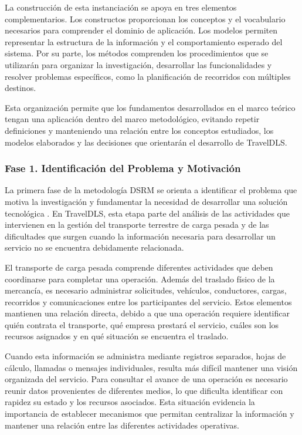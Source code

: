 La construcción de esta instanciación se apoya en tres elementos complementarios. Los constructos proporcionan los conceptos y el vocabulario necesarios para comprender el dominio de aplicación. Los modelos permiten representar la estructura de la información y el comportamiento esperado del sistema. Por su parte, los métodos comprenden los procedimientos que se utilizarán para organizar la investigación, desarrollar las funcionalidades y resolver problemas específicos, como la planificación de recorridos con múltiples destinos.

Esta organización permite que los fundamentos desarrollados en el marco teórico tengan una aplicación dentro del marco metodológico, evitando repetir definiciones y manteniendo una relación entre los conceptos estudiados, los modelos elaborados y las decisiones que orientarán el desarrollo de TravelDLS.

\subsubsection{Fase 1. Identificación del Problema y Motivación}
\label{sec:metodo-fase1}

La primera fase de la metodología DSRM se orienta a identificar el problema que motiva la investigación y fundamentar la necesidad de desarrollar una solución tecnológica \parencite{peffers2007dsrm}. En TravelDLS, esta etapa parte del análisis de las actividades que intervienen en la gestión del transporte terrestre de carga pesada y de las dificultades que surgen cuando la información necesaria para desarrollar un servicio no se encuentra debidamente relacionada.

El transporte de carga pesada comprende diferentes actividades que deben coordinarse para completar una operación. Además del traslado físico de la mercancía, es necesario administrar solicitudes, vehículos, conductores, cargas, recorridos y comunicaciones entre los participantes del servicio. Estos elementos mantienen una relación directa, debido a que una operación requiere identificar quién contrata el transporte, qué empresa prestará el servicio, cuáles son los recursos asignados y en qué situación se encuentra el traslado.

Cuando esta información se administra mediante registros separados, hojas de cálculo, llamadas o mensajes individuales, resulta más difícil mantener una visión organizada del servicio. Para consultar el avance de una operación es necesario reunir datos provenientes de diferentes medios, lo que dificulta identificar con rapidez su estado y los recursos asociados. Esta situación evidencia la importancia de establecer mecanismos que permitan centralizar la información y mantener una relación entre las diferentes actividades operativas.

